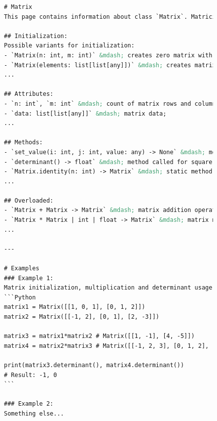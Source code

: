 \pagebreak
\vspace*{-90pt}
	\begin{figure}[H]
		\begin{lstlisting}[language=XML, caption=Краткий пример страницы <<Matrix>> на языке <<Markdown>>]
# Matrix
This page contains information about class `Matrix`. Matricies are basic algebraic objects, used in math...

## Initialization:
Possible variants for initialization:
- `Matrix(n: int, m: int)` &mdash; creates zero matrix with `n` rows and `m` columns;
- `Matrix(elements: list[list[any]])` &mdash; creates matrix with default values (about values [here](about:blank));
...

## Attributes:
- `n: int`, `m: int` &mdash; count of matrix rows and columns;
- `data: list[list[any]]` &mdash; matrix data;
...

## Methods:
- `set_value(i: int, j: int, value: any) -> None` &mdash; method sets value for `i` row and `j` column;
- `determinant() -> float` &mdash; method called for square matrix, which return its determinant;
- `Matrix.identity(n: int) -> Matrix` &mdash; static method which returns square identity matrix with size `n`;
...

## Overloaded:
- `Matrix + Matrix -> Matrix` &mdash; matrix addition operator;
- `Matrix * Matrix | int | float -> Matrix` &mdash; matrix multiplication operator;
...

---

# Examples
### Example 1: 
Matrix initialization, multiplication and determinant usage
```Python
matrix1 = Matrix([[1, 0, 1], [0, 1, 2]])
matrix2 = Matrix([[-1, 2], [0, 1], [2, -3]])

matrix3 = matrix1*matrix2 # Matrix([[1, -1], [4, -5]])
matrix4 = matrix2*matrix3 # Matrix([[-1, 2, 3], [0, 1, 2], [2, -3, -4]])

print(matrix3.determinant(), matrix4.determinant())
# Result: -1, 0
```

### Example 2: 
Something else...
		\end{lstlisting}
	\end{figure}

